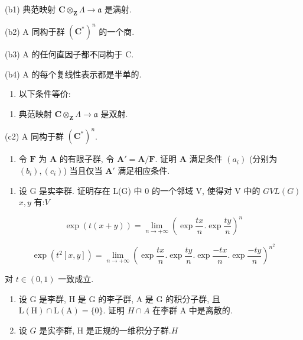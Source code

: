 (b1) 典范映射 \(\mathbf{C} \otimes_{\mathbf{Z}} \Lambda \to \mathfrak{a}\) 是满射.

(b2) A 同构于群 \((\mathbf{C}^{*})^{n}\) 的一个商.

(b3) A 的任何直因子都不同构于 C.

(b4) A 的每个复线性表示都是半单的.

\begin{enumerate}
\def\labelenumi{(\alph{enumi})}
\setcounter{enumi}{2}
\tightlist
\item
  以下条件等价:
\end{enumerate}

\begin{enumerate}
\def\labelenumi{(\roman{enumi})}
\setcounter{enumi}{149}
\tightlist
\item
  典范映射 \(\mathbf{C} \otimes_{\mathbf{Z}} \Lambda \to \mathfrak{a}\) 是双射.
\end{enumerate}

(c2) A 同构于群 \((\mathbf{C}^{*})^{n}\).

\begin{enumerate}
\def\labelenumi{(\alph{enumi})}
\setcounter{enumi}{3}
\tightlist
\item
  令 \(\mathbf{F}\) 为 \(\mathbf{A}\) 的有限子群, 令 \(\mathbf{A}' = \mathbf{A} / \mathbf{F}\). 证明 \(\mathbf{A}\) 满足条件 \((a_i)\) (分别为 \((b_i), (c_i)\)) 当且仅当 \(\mathbf{A}'\) 满足相应条件.
\end{enumerate}

\begin{enumerate}
\def\labelenumi{\arabic{enumi}.}
\setcounter{enumi}{18}
\tightlist
\item
  设 G 是实李群. 证明存在 L(G) 中 0 的一个邻域 V, 使得对 V 中的 \(G\)\(V\)\(L(G)\)\(x, y\) 有:\(V\)
\end{enumerate}

\[
\exp (t (x + y)) = \lim _ {n \rightarrow + \infty} \left(\exp \frac {t x}{n}. \exp \frac {t y}{n}\right) ^ {n}
\]

\[
\exp (t ^ {2} [ x, y ]) = \lim _ {n \rightarrow + \infty} \left(\exp \frac {t x}{n}. \exp \frac {t y}{n}. \exp \frac {- t x}{n}. \exp \frac {- t y}{n}\right) ^ {n ^ {2}}
\]

对 \(t \in (0, 1)\) 一致成立.

\begin{enumerate}
\def\labelenumi{\arabic{enumi}.}
\setcounter{enumi}{19}
\item
  设 G 是李群, H 是 G 的李子群, A 是 G 的积分子群, 且 \(\mathrm{L}(\mathrm{H}) \cap \mathrm{L}(\mathrm{A}) = \{0\}\). 证明 \(H \cap A\) 在李群 A 中是离散的.
\item
  设 \(G\) 是实李群, H 是正规的一维积分子群.\(H\)
\end{enumerate}


